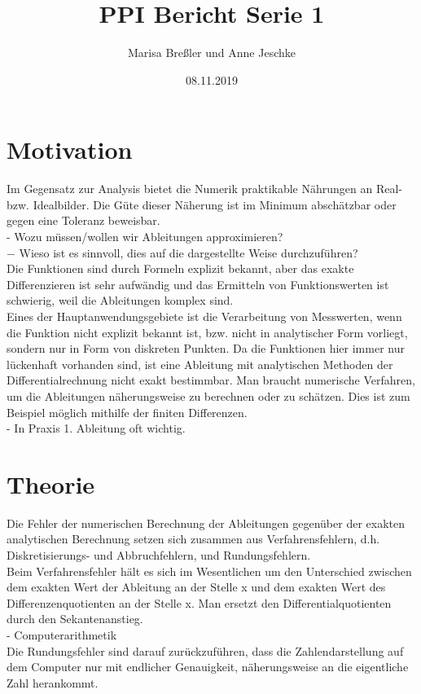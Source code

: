 \documentclass{scrartcl}
\begin{document}
\title{PPI Bericht Serie 1}
\author{Marisa Breßler und Anne Jeschke}
\date{08.11.2019}
\maketitle
\tableofcontents
\section{Motivation}
\label{sec:motivation}
Im Gegensatz zur Analysis bietet die Numerik praktikable Nährungen an Real- bzw. Idealbilder. Die Güte dieser Näherung ist im Minimum abschätzbar oder gegen eine Toleranz beweisbar. \\
- Wozu müssen/wollen wir Ableitungen approximieren?\\
−	Wieso ist es sinnvoll, dies auf die dargestellte Weise durchzuführen?\\
Die Funktionen sind durch Formeln explizit bekannt, aber das exakte Differenzieren ist sehr aufwändig und das Ermitteln von Funktionswerten ist schwierig, weil die Ableitungen komplex sind.\\
Eines der Hauptanwendungsgebiete ist die Verarbeitung von Messwerten, wenn die Funktion nicht explizit bekannt ist, bzw. nicht in analytischer Form vorliegt, sondern nur in Form von diskreten Punkten. Da die Funktionen hier immer nur lückenhaft vorhanden sind, ist eine Ableitung mit analytischen Methoden der Differentialrechnung nicht exakt bestimmbar. Man braucht numerische Verfahren, um die Ableitungen näherungsweise zu berechnen oder zu schätzen. Dies ist zum Beispiel möglich mithilfe der finiten Differenzen.\\
- In Praxis 1. Ableitung oft wichtig.

\section{Theorie}
\label{sec:theorie}
Die Fehler der numerischen Berechnung der Ableitungen gegenüber der exakten analytischen Berechnung setzen sich zusammen aus Verfahrensfehlern, d.h. Diskretisierungs- und Abbruchfehlern, und Rundungsfehlern.\\
Beim Verfahrensfehler hält es sich im Wesentlichen um den Unterschied zwischen dem exakten Wert der Ableitung an der Stelle x und dem exakten Wert des Differenzenquotienten an der Stelle x. Man ersetzt den Differentialquotienten durch den Sekantenanstieg.\\
- Computerarithmetik\\
Die Rundungsfehler sind darauf zurückzuführen, dass die Zahlendarstellung auf dem Computer nur mit endlicher Genauigkeit, näherungsweise an die eigentliche Zahl herankommt.
\end{document}
